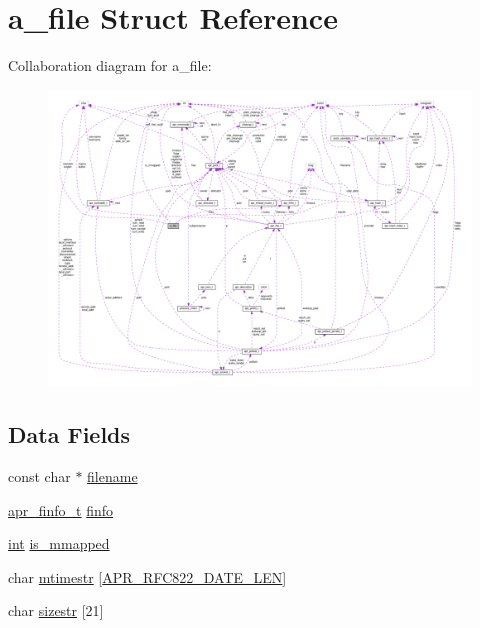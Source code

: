 \hypertarget{structa__file}{}\section{a\+\_\+file Struct Reference}
\label{structa__file}


Collaboration diagram for a\+\_\+file\+:
\nopagebreak
\begin{figure}[H]
\begin{center}
\leavevmode
\includegraphics[width=350pt]{structa__file__coll__graph}
\end{center}
\end{figure}
\subsection*{Data Fields}
\begin{DoxyCompactItemize}
\item 
const char $\ast$ \hyperlink{structa__file_a33b9ded780749ce4892e770453236881}{filename}
\item 
\hyperlink{structapr__finfo__t}{apr\+\_\+finfo\+\_\+t} \hyperlink{structa__file_a065cb41ca77467d8fd72acefe0f8644c}{finfo}
\item 
\hyperlink{pcre_8txt_a42dfa4ff673c82d8efe7144098fbc198}{int} \hyperlink{structa__file_a3af8626a72019fd067b1338942374c66}{is\+\_\+mmapped}
\item 
char \hyperlink{structa__file_a4102a1f940d4871032950fc21c7b495f}{mtimestr} \mbox{[}\hyperlink{group__apr__time_ga33933cf7a3e3c2cf6082c5f6d22ca3e5}{A\+P\+R\+\_\+\+R\+F\+C822\+\_\+\+D\+A\+T\+E\+\_\+\+L\+EN}\mbox{]}
\item 
char \hyperlink{structa__file_a12a49e8c0f81f545d2e648294409e62e}{sizestr} \mbox{[}21\mbox{]}
\end{DoxyCompactItemize}


